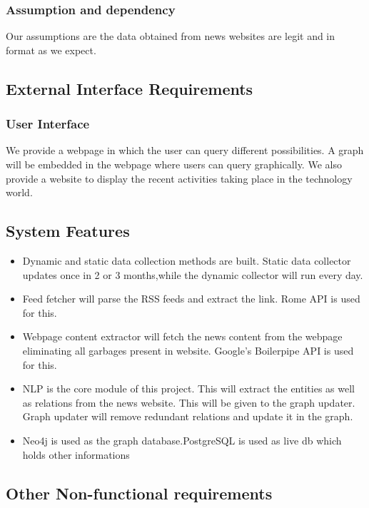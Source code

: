 \subsubsection{Assumption and dependency}
\par Our assumptions are the data obtained from news websites are legit and in format as we expect.

\subsection{External Interface Requirements}
\subsubsection{User Interface}
\par We provide a webpage in which the user can query different possibilities. A graph will be embedded in the webpage where users can query graphically. We also provide a website to display the recent activities taking place in the technology world.

\subsection{System Features}
\begin{itemize}
\item Dynamic and static data collection methods are built. Static data collector updates once in 2 or 3 months,while the dynamic collector will run every day.
\item Feed fetcher will parse the RSS feeds and extract the link. Rome API is used for this.
\item Webpage content extractor will fetch the news content from the webpage eliminating all garbages present in website. Google's Boilerpipe API is used for this.
\item NLP is the core module of this project. This will extract the entities as well as relations from the news website. This will be given to the graph updater. Graph updater will remove redundant relations and update it in the graph.
\item Neo4j is used as the graph database.PostgreSQL is used as live db which holds other informations
\end{itemize}

\subsection{Other Non-functional requirements}

